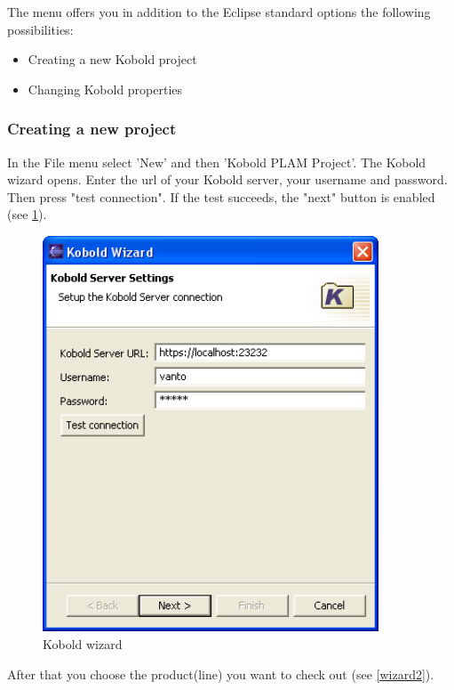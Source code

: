 The menu offers you in addition to the Eclipse standard options the following
possibilities:
\begin{itemize}
	\item Creating a new Kobold project
	\item Changing Kobold properties
\end{itemize}

\subsubsection{Creating a new project}

In the File menu select 'New' and then 'Kobold PLAM Project'. The Kobold wizard opens.
Enter the url of your Kobold server, your username and password. Then press
"test connection". If the test succeeds, the "next" button is enabled (see \ref{wizard1}).

\begin{figure}[h!]
\begin{center}
\includegraphics[width=10cm]{wizard1.png}
   \caption{Kobold wizard}
\label{wizard1}
\end{center}
\end{figure}\par

After that you choose the product(line) you want to check out (see \ref{wizard2}).

